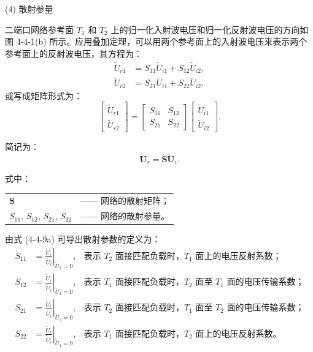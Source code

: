 (4) 散射参量

二端口网络参考面 $ T_1 $ 和 $ T_2 $ 上的归一化入射波电压和归一化反射波电压的方向如图 4-4-1(b) 所示。应用叠加定理，可以用两个参考面上的入射波电压来表示两个参考面上的反射波电压，其方程为：
\begin{equation}
	\begin{aligned}
		\widetilde{U}_{r1} &= S_{11} \widetilde{U}_{i1} + S_{12} \widetilde{U}_{i2}, \\
		\widetilde{U}_{r2} &= S_{21} \widetilde{U}_{i1} + S_{22} \widetilde{U}_{i2}.
	\end{aligned}
	\tag{4-4-9a}
\end{equation}
或写成矩阵形式为：
\begin{equation}
	\begin{bmatrix}
		\widetilde{U}_{r1} \\
		\widetilde{U}_{r2}
	\end{bmatrix}
	=
	\begin{bmatrix}
		S_{11} & S_{12} \\
		S_{21} & S_{22}
	\end{bmatrix}
	\begin{bmatrix}
		\widetilde{U}_{i1} \\
		\widetilde{U}_{i2}
	\end{bmatrix}.
	\tag{4-4-9b}
\end{equation}

简记为：
\[
\widetilde{\mathbf{U}}_r = \mathbf{S} \widetilde{\mathbf{U}}_i.
\]

式中：
\begin{tabular}{p{} p{}}
	$ \mathbf{S} $ & —— 网络的散射矩阵； \\
	$ S_{11} $, $ S_{12} $, $ S_{21} $, $ S_{22} $ & —— 网络的散射参量。
\end{tabular}

由式 (4-4-9a) 可导出散射参数的定义为：
\begin{align*}
	S_{11} &= \left. \frac{\widetilde{U}_r}{\widetilde{U}_i} \right|_{\widetilde{U}_2 = 0}, & \text{表示 } T_2 \text{ 面接匹配负载时，} T_1 \text{ 面上的电压反射系数；} \\
	S_{12} &= \left. \frac{\widetilde{U}_r}{\widetilde{U}_i} \right|_{\widetilde{U}_1 = 0}, & \text{表示 } T_1 \text{ 面接匹配负载时，} T_2 \text{ 面至 } T_1 \text{ 面的电压传输系数；} \\
	S_{21} &= \left. \frac{\widetilde{U}_r}{\widetilde{U}_i} \right|_{\widetilde{U}_2 = 0}, & \text{表示 } T_2 \text{ 面接匹配负载时，} T_1 \text{ 面至 } T_2 \text{ 面的电压传输系数；} \\
	S_{22} &= \left. \frac{\widetilde{U}_r}{\widetilde{U}_i} \right|_{\widetilde{U}_1 = 0}, & \text{表示 } T_1 \text{ 面接匹配负载时，} T_2 \text{ 面上的电压反射系数。}
\end{align*}

